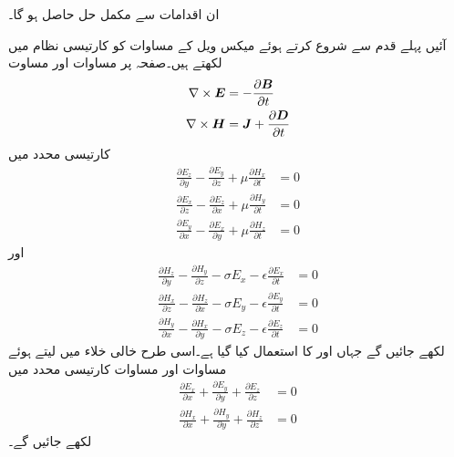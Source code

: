ان اقدامات سے مکمل حل حاصل ہو گا۔

آئیں پہلے قدم سے شروع کرتے ہوئے میکس ویل کے مساوات کو کارتیسی نظام میں لکھتے ہیں۔صفحہ  پر مساوات  اور  مساوت 
\begin{align*}
\nabla \times {\ensuremath{{\boldsymbol{E}}}}&=-\frac{\partial {\ensuremath{{\boldsymbol{B}}}}}{\partial t}\\
\nabla \times {\ensuremath{{\boldsymbol{H}}}}&={{\boldsymbol{J}}}+\frac{\partial {\ensuremath{{\boldsymbol{D}}}}}{\partial t}
\end{align*}
کارتیسی محدد میں
\begin{align}
\frac{\partial E_z}{\partial y}-\frac{\partial E_y}{\partial z}+\mu \frac{\partial H_x}{\partial t}&=0  \label{مساوات_مویج_میکس_ویل_الف}\\
\frac{\partial E_x}{\partial z}-\frac{\partial E_z}{\partial x}+\mu \frac{\partial H_y}{\partial t}&=0   \label{مساوات_مویج_میکس_ویل_ب}\\
\frac{\partial E_y}{\partial x}-\frac{\partial E_x}{\partial y}+\mu \frac{\partial H_z}{\partial t}&=0 \label{مساوات_مویج_میکس_ویل_پ}
\end{align}
اور
\begin{align}
\frac{\partial H_z}{\partial y}-\frac{\partial H_y}{\partial z}-\sigma E_x-\epsilon \frac{\partial E_x}{\partial t}&=0  \label{مساوات_مویج_میکس_ویل_ت}\\
\frac{\partial H_x}{\partial z}-\frac{\partial H_z}{\partial x}-\sigma E_y-\epsilon \frac{\partial E_y}{\partial t}&=0  \label{مساوات_مویج_میکس_ویل_ٹ}\\
\frac{\partial H_y}{\partial x}-\frac{\partial H_x}{\partial y}-\sigma E_z-\epsilon \frac{\partial E_z}{\partial t}&=0 \label{مساوات_مویج_میکس_ویل_ث}
\end{align}
لکھے جائیں گے جہاں  اور  کا استعمال کیا گیا ہے۔اسی طرح خالی خلاء میں  لیتے ہوئے  مساوات  اور مساوات  کارتیسی محدد میں
\begin{align}
\frac{\partial E_x}{\partial x}+\frac{\partial E_y}{\partial y}+\frac{\partial E_z}{\partial z}&=0 \label{مساوات_مویج_میکس_ویل_ج}\\
\frac{\partial H_x}{\partial x}+\frac{\partial H_y}{\partial y}+\frac{\partial H_z}{\partial z}&=0 \label{مساوات_مویج_میکس_ویل_چ}
\end{align}
لکھے جائیں گے۔

